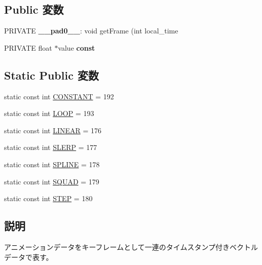 \subsection*{Public 変数}
\begin{CompactItemize}
\item 
\hypertarget{classm3g_1_1KeyframeSequence_09d77e6556195583218cf7f0bc11ab1c}{
PRIVATE \textbf{\_\-\_\-pad0\_\-\_\-}: void getFrame (int local\_\-time}
\label{classm3g_1_1KeyframeSequence_09d77e6556195583218cf7f0bc11ab1c}

\item 
\hypertarget{classm3g_1_1KeyframeSequence_2216ebfe3179bd5c53663d0780a0a190}{
PRIVATE float $\ast$value \textbf{const}}
\label{classm3g_1_1KeyframeSequence_2216ebfe3179bd5c53663d0780a0a190}

\end{CompactItemize}
\subsection*{Static Public 変数}
\begin{CompactItemize}
\item 
static const int \hyperlink{classm3g_1_1KeyframeSequence_b45ff833865ae8962be27923995f91a3}{CONSTANT} = 192
\item 
static const int \hyperlink{classm3g_1_1KeyframeSequence_ecc439231d4f3639e6f6a9625615a0f7}{LOOP} = 193
\item 
static const int \hyperlink{classm3g_1_1KeyframeSequence_23ccf193c67257f1be26417041cecb31}{LINEAR} = 176
\item 
static const int \hyperlink{classm3g_1_1KeyframeSequence_77ebb943765f530d2883e1c26127d3ce}{SLERP} = 177
\item 
static const int \hyperlink{classm3g_1_1KeyframeSequence_fbb002ac924c1349dead17c16b6fa720}{SPLINE} = 178
\item 
static const int \hyperlink{classm3g_1_1KeyframeSequence_0ad85e76e101b5eabf5a5c5f48648845}{SQUAD} = 179
\item 
static const int \hyperlink{classm3g_1_1KeyframeSequence_07dc1c0bf7f480095150d1b1c34c8218}{STEP} = 180
\end{CompactItemize}


\subsection{説明}
アニメーションデータをキーフレームとして一連のタイムスタンプ付きベクトルデータで表す。 

